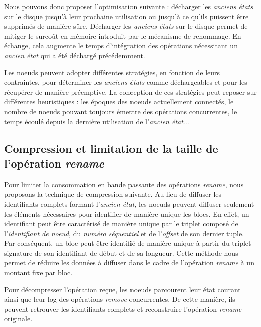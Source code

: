 \documentclass[12pt]{thesul}
\begin{document}
Nous pouvons donc proposer l'optimisation suivante : décharger les \emph{anciens états} sur le disque jusqu'à leur prochaine utilisation ou jusqu'à ce qu'ils puissent être supprimés de manière sûre.
Décharger les \emph{anciens états} sur le disque permet de mitiger le surcoût en mémoire introduit par le mécanisme de renommage.
En échange, cela augmente le temps d'intégration des opérations nécessitant un \emph{ancien état} qui a été déchargé précédemment.

Les noeuds peuvent adopter différentes stratégies, en fonction de leurs contraintes, pour déterminer les \emph{anciens états} comme déchargeables et pour les récupérer de manière préemptive.
La conception de ces stratégies peut reposer sur différentes heuristiques : les époques des noeuds actuellement connectés, le nombre de noeuds pouvant toujours émettre des opérations concurrentes, le temps écoulé depuis la dernière utilisation de l'\emph{ancien état}...

\subsection{Compression et limitation de la taille de l'opération \emph{rename}}

Pour limiter la consommation en bande passante des opérations \emph{rename}, nous proposons la technique de compression suivante.
Au lieu de diffuser les identifiants complets formant l'\emph{ancien état}, les noeuds peuvent diffuser seulement les éléments nécessaires pour identifier de manière unique les blocs.
En effet, un identifiant peut être caractérisé de manière unique par le triplet composé de l'\emph{identifiant de noeud}, du \emph{numéro séquentiel} et de l'\emph{offset} de son dernier tuple.
Par conséquent, un bloc peut être identifié de manière unique à partir du triplet signature de son identifiant de début et de sa longueur.
Cette méthode nous permet de réduire les données à diffuser dans le cadre de l'opération \emph{rename} à un montant fixe par bloc.

Pour décompresser l'opération reçue, les noeuds parcourent leur état courant ainsi que leur log des opérations \emph{remove} concurrentes.
De cette manière, ils peuvent retrouver les identifiants complets et reconstruire l'opération \emph{rename} originale.
\end{document}
